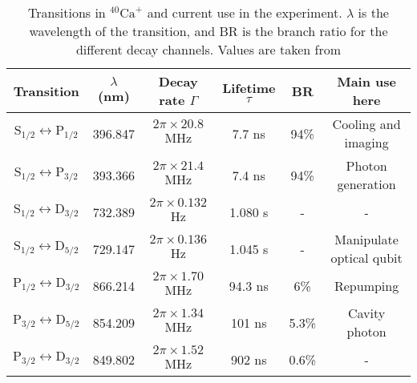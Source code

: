 \begin{table}[H]
\centering
\begin{tabular}{c c c c c c}
 \toprule
    {Transition} & { $\lambda$ (nm)} & {Decay rate $\Gamma$} & Lifetime $\tau$ & BR & {Main use here} \\ \midrule
   $\text{S}_{1/2} \leftrightarrow \text{P}_{1/2}$ & 396.847 & $2\pi \times 20.8$ MHz & 7.7 ns & 94\% &Cooling and imaging \\
    $\text{S}_{1/2} \leftrightarrow \text{P}_{3/2}$  & 393.366 & $2\pi \times 21.4$ MHz & 7.4 ns & 94\% &Photon generation\\ \midrule
   $\text{S}_{1/2} \leftrightarrow \text{D}_{3/2}$ & 732.389 & $2\pi \times 0.132$ Hz & 1.080 s & - & - \\
    $\text{S}_{1/2} \leftrightarrow \text{D}_{5/2}$  & 729.147 & $2\pi \times 0.136$ Hz & 1.045 s & - & Manipulate optical qubit \\\midrule
    $\text{P}_{1/2} \leftrightarrow \text{D}_{3/2}$  & 866.214 &  $2\pi \times 1.70$ MHz  &  94.3 ns & 6\% & Repumping \\
    $\text{P}_{3/2} \leftrightarrow \text{D}_{5/2}$  & 854.209 & $2\pi \times 1.34$ MHz & 101 ns & 5.3\%  & Cavity photon  \\
    $\text{P}_{3/2} \leftrightarrow \text{D}_{3/2}$  & 849.802 & $2\pi \times 1.52$ MHz  & 902 ns & 0.6\%  & - \\ \bottomrule
\end{tabular}
\caption{Transitions in $^{40}\text{Ca}^+$ and current use in the experiment. $\lambda$ is the wavelength of the transition, and BR is the branch ratio for the different decay channels. Values are taken from \cite{ion_spacing,stute}}
\label{transitiontable}
\end{table}


